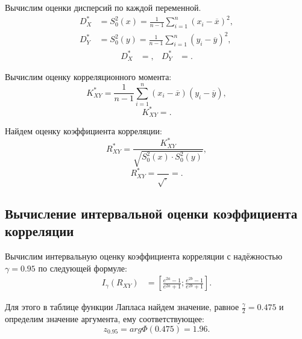 \documentclass[14pt,hidelinks]{extarticle}
\begin{document}
Вычислим оценки дисперсий по каждой переменной.
\begin{equation}
  \begin{aligned}
    D^*_X &= S^2_0(x) = \frac{1}{n-1} \sum_{i=1}^{n} (x_i - \overline{x})^2, \\
    D^*_Y &= S^2_0(y) = \frac{1}{n-1} \sum_{i=1}^{n} (y_i - \overline{y})^2,
  \end{aligned}
\end{equation} 
\begin{equation*}
  \begin{aligned}
    D^*_X &= , &
    D^*_Y &= .
  \end{aligned}
\end{equation*}

Вычислим оценку корреляционного момента:
\begin{equation}
  K^*_{XY} = \frac{1}{n-1} \sum_{i=1}^{n}{(x_i - \overline{x})(y_i - \overline{y})},
\end{equation} 
\begin{equation*}
  K^*_{XY} = .
\end{equation*}

Найдем оценку коэффициента корреляции:
\begin{equation}
  R^*_{XY} = \frac{K^*_{XY}}{\sqrt{S^2_0(x) \cdot S^2_0(y)}},
\end{equation} 
\begin{equation*}
  R^*_{XY} = \dfrac{}
  {\sqrt{ \cdot }} = 
  .
\end{equation*}

\subsection{Вычисление интервальной оценки коэффициента корреляции}

Вычислим интервальную оценку коэффициента корреляции с надёжностью $\gamma = 0.95$ по следующей формуле:
\begin{align}
  I_{\gamma} (R_{XY}) &= \left[ \frac{e^{2a}-1}{e^{2a}+1}; \frac{e^{2b}-1}{e^{2b}+1} \right]. 
\end{align}

Для этого в таблице функции Лапласа найдем значение, равное $\frac{\gamma}{2} = 0.475$ и определим значение аргумента, ему соответствующее:
\begin{equation*}
  z_{0.95} = arg \Phi (0.475) = 1.96. 
\end{equation*}
\end{document}
